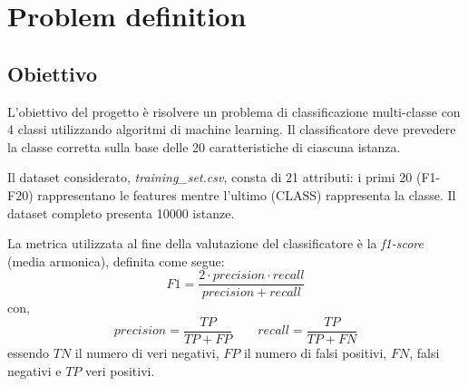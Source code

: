 \section{Problem definition}
        
        \subsection{Obiettivo}
        
                L'obiettivo del progetto è risolvere un problema di classificazione multi-classe con 4 classi utilizzando algoritmi di machine learning. Il classificatore deve prevedere la classe corretta sulla base delle 20 caratteristiche di ciascuna istanza.
                \bigbreak
            
                Il dataset considerato, \textit{training\_set.csv}, consta di 21 attributi: i primi 20 (F1-F20) rappresentano le features mentre l'ultimo (CLASS) rappresenta la classe.
                Il dataset completo presenta 10000 istanze.
                \bigbreak
            
                La metrica utilizzata al fine della valutazione del classificatore è la \textit{f1-score} (media armonica), definita come segue:
                        \begin{displaymath}
                            F1 = \frac{2 \cdot precision \cdot recall}{precision + recall}
                        \end{displaymath}
                 con,
                        \begin{displaymath}
                            precision = \frac{TP}{TP + FP} \qquad recall = \frac{TP}{TP + FN}
                        \end{displaymath}
                 essendo $TN$ il numero di veri negativi, $FP$ il numero di falsi positivi, $FN$, falsi negativi e $TP$ veri positivi.
